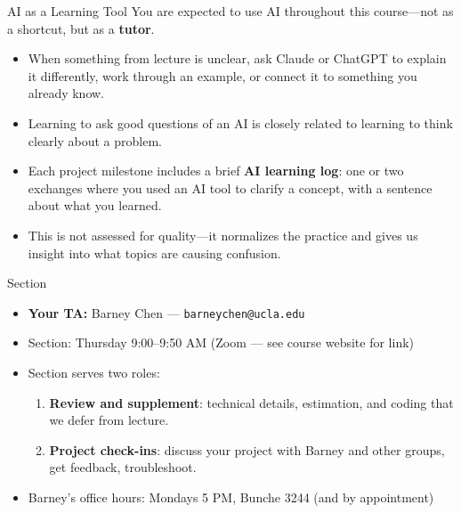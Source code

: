 \documentclass[handout,xcolor=dvipsnames,pdftex,hyperref={colorlinks=false}]{beamer}
\newcommand\makebiggaps{\addtolength{\itemsep}{.5\baselineskip}}
\begin{document}
\begin{frame}{AI as a Learning Tool}
\small
{} You are expected to use AI throughout this course---not as a shortcut, but as a \textbf{tutor}.\\
\medskip
\begin{itemize}
\item<2-> When something from lecture is unclear, ask Claude or ChatGPT to explain it differently, work through an example, or connect it to something you already know.
\medskip
\item<3-> Learning to ask good questions of an AI is closely related to learning to think clearly about a problem.
\medskip
\item<4-> Each project milestone includes a brief \textbf{AI learning log}: one or two exchanges where you used an AI tool to clarify a concept, with a sentence about what you learned.
\medskip
\item<5-> This is not assessed for quality---it normalizes the practice and gives us insight into what topics are causing confusion.
\end{itemize}
\end{frame}


\begin{frame}{Section}
\small
\begin{itemize}
\makebiggaps
\item<1-> \textbf{Your TA:} Barney Chen --- \texttt{barneychen@ucla.edu}
\medskip
\item<2-> Section: Thursday 9:00--9:50 AM (Zoom --- see course website for link)
\medskip
\item<3-> Section serves two roles:
  \begin{enumerate}
  \item \textbf{Review and supplement}: technical details, estimation, and coding that we defer from lecture.
  \item \textbf{Project check-ins}: discuss your project with Barney and other groups, get feedback, troubleshoot.
  \end{enumerate}
\medskip
\item<4-> Barney's office hours: Mondays 5 PM, Bunche 3244 (and by appointment)
\end{itemize}
\end{frame}
\end{document}
